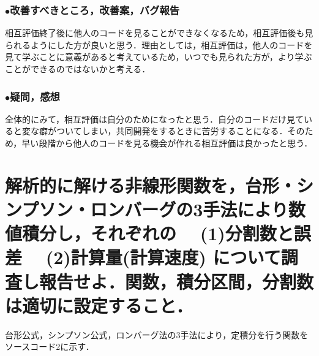 \documentclass[titlepage,dvipdfmx]{jsarticle}
\begin{document}
\subsubsection*{$\bullet$改善すべきところ，改善案，バグ報告}
相互評価終了後に他人のコードを見ることができなくなるため，相互評価後も見られるようにした方が良いと思う．理由としては，相互評価は，他人のコードを見て学ぶことに意義があると考えているため，いつでも見られた方が，より学ぶことができるのではないかと考える．

\subsubsection*{$\bullet$疑問，感想}
全体的にみて，相互評価は自分のためになったと思う．自分のコードだけ見ていると変な癖がついてしまい，共同開発をするときに苦労することになる．そのため，早い段階から他人のコードを見る機会が作れる相互評価は良かったと思う．

\section{解析的に解ける非線形関数を，台形・シンプソン・ロンバーグの3手法により数値積分し，それぞれの\protect\linebreak
　(1)分割数と誤差\protect\linebreak
　(2)計算量(計算速度)\protect\linebreak
について調査し報告せよ．関数，積分区間，分割数は適切に設定すること．}
台形公式，シンプソン公式，ロンバーグ法の3手法により，定積分を行う関数をソースコード2に示す．
\end{document}
